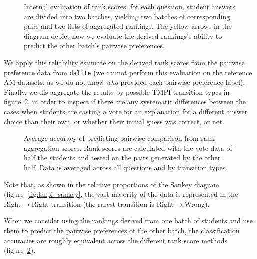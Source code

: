 \documentclass[notitlepage,12pt]{jedm}
\begin{document}
\begin{figure}[H]
	\centering
	\scalebox{0.5}{}
	\caption{
		Internal evaluation of rank scores: for each question, 
		student answers are divided into two batches, yielding two batches of 
		corresponding pairs and two lists of aggregated rankings.
		The yellow arrows in the diagram depict how we evaluate the derived rankings's ability to predict the other batch's pairwise preferences.
	}
	\label{fig:evaluate_rankings}
\end{figure}

We apply this reliability estimate on the derived rank scores from the 
pairwise preference data from \verb|dalite| (we cannot perform this evaluation 
on the reference AM datasets, as we do not know \textit{who} provided each pairwise 
preference label). 
Finally, we dis-aggregate the results by possible TMPI transition types in figure~\ref{fig:acc_by_batch}, in order to inspect if there are any systematic 
differences between the cases when students are casting 
a vote for an explanation for a different answer choice than their own, or 
whether their initial guess was correct, or not.

\begin{figure}[H]
  {
	\centering
	\scalebox{0.75}{}
	\caption{
		Average accuracy of predicting pairwise comparison from
		rank aggregation scores.
		Rank scores are calculated with the vote data of half the students and 
		tested on the pairs generated by the other half. 
		Data is averaged across all questions and by
		transition types.  
	}
	\label{fig:acc_by_batch}
}
\end{figure}

Note that, as shown in the relative proportions of the Sankey 
diagram (figure~\ref{fig:tmpi_sankey}, the vast majority of the data is 
represented in the Right$\rightarrow$Right transition (the rarest transition is 
Right$\rightarrow$Wrong).

When we consider using the rankings derived from one batch of students and use 
them to predict the pairwise preferences of the other batch, the classification 
accuracies are roughly equivalent across the different rank score methods 
(figure~\ref{fig:acc_by_batch}).
\end{document}
